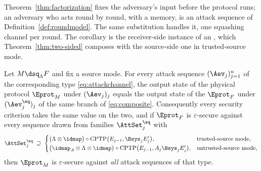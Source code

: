 
Theorem~\ref{thm:factorization} fixes the adversary's input before the
protocol runs; an adversary who acts round by round, with a memory, is an
attack sequence of Definition~\ref{def:roundmodel}. The same substitution
handles it, one squashing channel per round. The corollary is the
receiver-side instance of an , which
Theorem~\ref{thm:two-sided} composes with the source-side one in
trusted-source mode.

\begin{corollary}\label{cor:sequential}
Let $M\dsq_{\Lambda}F$ and fix a source mode. For every attack sequence
$(\Aev_j)_{j=1}^{n}$ of the corresponding type \eqref{eq:attackchannel}, the
output state of the physical protocol $\Eprot_M$ under $(\Aev_j)_j$ equals the
output state of the  $\Eprot_F$ under $(\Aev^{\sq}_j)_j$ of
the same branch of \eqref{eq:composite}. Consequently every security criterion
takes the same value on the two, and if $\Eprot_F$ is $\varepsilon$-secure
against every sequence drawn from families $\AttSet^{\sq}_j$ with
\begin{equation}\label{eq:seqcover}
  \AttSet^{\sq}_j\;\supseteq\;
  \begin{cases}
    \big(\Lambda\otimes\idmap\big)\circ
      \mathrm{CPTP}\big(E_{j-1},\Bsys_jE'_j\big),
      & \text{trusted-source mode},\\[0.3ex]
    \big(\idmap_{A}\otimes\Lambda\otimes\idmap\big)\circ
      \mathrm{CPTP}\big(E_{j-1},A_j\Bsys_jE'_j\big),
      & \text{untrusted-source mode},
  \end{cases}
\end{equation}
then $\Eprot_M$ is $\varepsilon$-secure against \emph{all} attack sequences of
that type.
\end{corollary}

